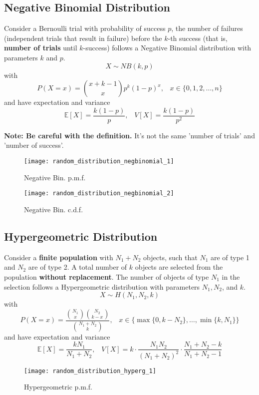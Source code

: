 \subsection{Negative Binomial Distribution}
Consider a Bernoulli trial with probability of success $p$, the number of failures (independent trials that result in failure) before the $k$-th success 
(that is, \textbf{number of trials} until $k$-success) follows a Negative Binomial distribution with parameters $k$ and $p$.
\[ X \sim NB(k,p)\]
with
\[ P(X=x) = \binom{x+k-1}{x} p^k(1-p)^x,\;\;\; x \in \{0,1,2,\dots,n\} \]
and have expectation and variance
\[ \mathbb{E}[X] = \frac{k(1-p)}{p},\;\;\; V[X] = \frac{k(1-p)}{p^2} \]

\textbf{Note: Be careful with the definition.} It's not the same 'number of trials' and 'number of success'.

\begin{figure}[!ht]
    \begin{minipage}{0.45\linewidth}
      \texttt{[image: random\_distribution\_negbinomial\_1]}
      \caption{Negative Bin. p.m.f.}
    \end{minipage}
    \hfill
    \begin{minipage}{0.45\linewidth}
      \texttt{[image: random\_distribution\_negbinomial\_2]}
      \caption{Negative Bin. c.d.f.}
    \end{minipage}
\end{figure}

\subsection{Hypergeometric Distribution}
Consider a \textbf{finite population} with $N_1+N_2$ objects, such that $N_1$ are of type 1 and $N_2$ are of type 2. A total number of $k$
objects are selected from the population \textbf{without replacement}. The number of objects of type $N_1$ in the selection follows 
a Hypergeometric distribution with parameters $N_1, N_2$, and $k$.
\[ X \sim H(N_1,N_2,k)\]
with
\[ P(X=x) = \frac{\binom{N_1}{x}\binom{N_2}{k-x}}{\binom{N_1+N_2}{k}},\;\;\; x \in \{\max\{0,k-N_2\},\dots,\min\{k,N_1\} \} \]
and have expectation and variance
\[ \mathbb{E}[X] = \frac{kN_1}{N_1+N_2},\;\;\; V[X] = k\cdot\frac{N_1N_2}{(N_1+N_2)^2}\cdot\frac{N_1+N_2-k}{N_1+N_2-1} \]

\begin{figure}[!ht]
    \begin{center}
        \texttt{[image: random\_distribution\_hyperg\_1]}
        \caption{Hypergeometric p.m.f.}
    \end{center}
\end{figure}


